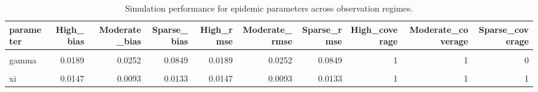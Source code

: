 \begin{table}[!h]
\centering
\caption{\label{tab:tab:epi_regime}Simulation performance for epidemic parameters across observation regimes.}
\centering
\fontsize{8}{10}\selectfont
\begin{tabular}[t]{lrrrrrrrrr}
\toprule
parameter & High\_bias & Moderate\_bias & Sparse\_bias & High\_rmse & Moderate\_rmse & Sparse\_rmse & High\_coverage & Moderate\_coverage & Sparse\_coverage\\
\midrule
\cellcolor{gray!10}{beta} & \cellcolor{gray!10}{0.0004} & \cellcolor{gray!10}{-0.0318} & \cellcolor{gray!10}{-0.0268} & \cellcolor{gray!10}{0.0004} & \cellcolor{gray!10}{0.0318} & \cellcolor{gray!10}{0.0268} & \cellcolor{gray!10}{1} & \cellcolor{gray!10}{1} & \cellcolor{gray!10}{1}\\
gamma & 0.0189 & 0.0252 & 0.0849 & 0.0189 & 0.0252 & 0.0849 & 1 & 1 & 0\\
\cellcolor{gray!10}{kappa} & \cellcolor{gray!10}{-0.0571} & \cellcolor{gray!10}{0.0080} & \cellcolor{gray!10}{-0.0254} & \cellcolor{gray!10}{0.0571} & \cellcolor{gray!10}{0.0080} & \cellcolor{gray!10}{0.0254} & \cellcolor{gray!10}{1} & \cellcolor{gray!10}{1} & \cellcolor{gray!10}{1}\\
xi & 0.0147 & 0.0093 & 0.0133 & 0.0147 & 0.0093 & 0.0133 & 1 & 1 & 1\\
\bottomrule
\end{tabular}
\end{table}
